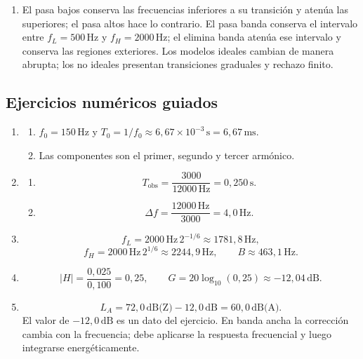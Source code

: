 \begin{enumerate}[label=\textbf{L\arabic*.},leftmargin=*]
    \item El pasa bajos conserva las frecuencias inferiores a su transición y
    atenúa las superiores; el pasa altos hace lo contrario. El pasa banda
    conserva el intervalo entre \(f_L=500\,\text{Hz}\) y
    \(f_H=2000\,\text{Hz}\); el elimina banda atenúa ese intervalo y conserva
    las regiones exteriores. Los modelos ideales cambian de manera abrupta;
    los no ideales presentan transiciones graduales y rechazo finito.
\end{enumerate}

\subsection*{Ejercicios numéricos guiados}

\begin{enumerate}[label=\textbf{G\arabic*.},leftmargin=*]
    \item
    \begin{enumerate}[label=\alph*)]
        \item \(f_0=150\,\text{Hz}\) y
        \(T_0=1/f_0\approx6{,}67\times10^{-3}\,\text{s}
        =6{,}67\,\text{ms}\).
        \item Las componentes son el primer, segundo y tercer armónico.
    \end{enumerate}

    \item
    \begin{enumerate}[label=\alph*)]
        \item
        \[
            T_\mathrm{obs}=\frac{3000}{12000\,\text{Hz}}
                          =0{,}250\,\text{s}.
        \]
        \item
        \[
            \Delta f=\frac{12000\,\text{Hz}}{3000}
                    =4{,}0\,\text{Hz}.
        \]
    \end{enumerate}

    \item
    \[
        f_L=2000\,\text{Hz}\,2^{-1/6}
           \approx1781{,}8\,\text{Hz},
    \]
    \[
        f_H=2000\,\text{Hz}\,2^{1/6}
           \approx2244{,}9\,\text{Hz},
        \qquad
        B\approx463{,}1\,\text{Hz}.
    \]

    \item
    \[
        \lvert H\rvert=\frac{0{,}025}{0{,}100}=0{,}25,
        \qquad
        G=20\log_{10}(0{,}25)\approx-12{,}04\,\text{dB}.
    \]

    \item
    \[
        L_A=72{,}0\,\text{dB(Z)}-12{,}0\,\text{dB}
           =60{,}0\,\text{dB(A)}.
    \]
    El valor de \(-12{,}0\,\text{dB}\) es un dato del ejercicio. En banda
    ancha la corrección cambia con la frecuencia; debe aplicarse la respuesta
    frecuencial y luego integrarse energéticamente.
\end{enumerate}

